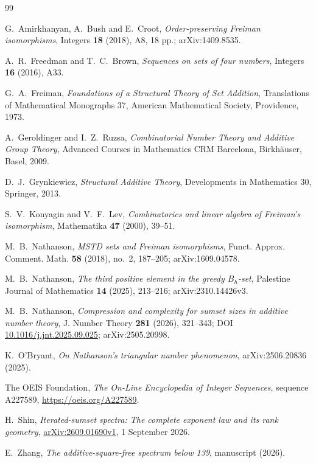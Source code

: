 \documentclass[11pt,reqno]{amsart}
\theoremstyle{plain}
\theoremstyle{definition}
\theoremstyle{plain}
\theoremstyle{plain}
\theoremstyle{plain}
\theoremstyle{plain}
\theoremstyle{plain}
\theoremstyle{plain}
\theoremstyle{definition}
\theoremstyle{definition}
\theoremstyle{definition}
\theoremstyle{plain}
\begin{document}
\begin{thebibliography}{99}

 G.~Amirkhanyan, A.~Bush and E.~Croot,
\emph{Order-preserving Freiman isomorphisms}, Integers \textbf{18}
(2018), A8, 18 pp.; arXiv:1409.8535.

 A.~R.~Freedman and T.~C.~Brown,
\emph{Sequences on sets of four numbers},
Integers \textbf{16} (2016), A33.

 G.~A.~Freiman,
\emph{Foundations of a Structural Theory of Set Addition},
Translations of Mathematical Monographs 37, American Mathematical Society,
Providence, 1973.

 A.~Geroldinger and I.~Z.~Ruzsa,
\emph{Combinatorial Number Theory and Additive Group Theory},
Advanced Courses in Mathematics CRM Barcelona, Birkh\"auser, Basel, 2009.

 D.~J.~Grynkiewicz,
\emph{Structural Additive Theory},
Developments in Mathematics 30, Springer, 2013.

 S.~V.~Konyagin and V.~F.~Lev,
\emph{Combinatorics and linear algebra of Freiman's isomorphism},
Mathematika \textbf{47} (2000), 39--51.

 M.~B.~Nathanson,
\emph{MSTD sets and Freiman isomorphisms},
Funct. Approx. Comment. Math. \textbf{58} (2018), no.~2, 187--205;
arXiv:1609.04578.

 M.~B.~Nathanson,
\emph{The third positive element in the greedy $B_h$-set},
Palestine Journal of Mathematics \textbf{14} (2025), 213--216;
arXiv:2310.14426v3.

 M.~B.~Nathanson,
\emph{Compression and complexity for sumset sizes in additive number theory},
J. Number Theory \textbf{281} (2026), 321--343;
DOI \href{https://doi.org/10.1016/j.jnt.2025.09.025}{10.1016/j.jnt.2025.09.025}; arXiv:2505.20998.

 K.~O'Bryant,
\emph{On Nathanson's triangular number phenomenon},
arXiv:2506.20836 (2025).

 The OEIS Foundation,
\emph{The On-Line Encyclopedia of Integer Sequences},
sequence A227589, \url{https://oeis.org/A227589}.

 H.~Shin,
\emph{Iterated-sumset spectra: The complete exponent law and its rank geometry},
\href{https://arxiv.org/abs/2609.01690v1}{arXiv:2609.01690v1},
1 September 2026.

 E.~Zhang,
\emph{The additive-square-free spectrum below 139},
manuscript (2026).

\end{thebibliography}
\end{document}
